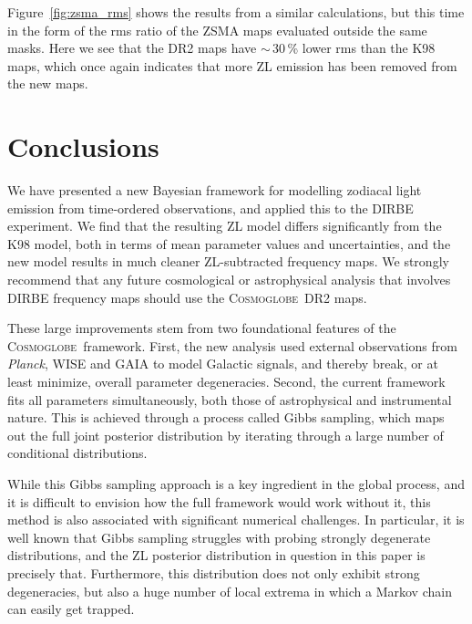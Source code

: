 \documentclass[twocolumn]{aa}
\def\Planck{\textit{Planck}}
\newcommand{\cosmoglobe}{\textsc{Cosmoglobe}}
\begin{document}
Figure~\ref{fig:zsma_rms} shows the results from a similar
calculations, but this time in the form of the rms ratio of the ZSMA
maps evaluated outside the same masks. Here we see that the DR2 maps
have $\sim$\,30\,\% lower rms than the K98 maps, which once
again indicates that more ZL emission has been removed from the
new maps.









\section{Conclusions}
\label{sec:conclusions}

We have presented a new Bayesian framework for modelling zodiacal
light emission from time-ordered observations, and applied this to the
DIRBE experiment. We find that the resulting ZL model differs
significantly from the K98 model, both in terms of mean parameter
values and uncertainties, and the new model results in much cleaner
ZL-subtracted frequency maps. We strongly recommend that any future
cosmological or astrophysical analysis that involves DIRBE frequency
maps should use the \cosmoglobe\ DR2 maps.

These large improvements stem from two foundational features of the
\cosmoglobe\ framework. First, the new analysis used external
observations from \Planck, WISE and GAIA to model Galactic signals,
and thereby break, or at least minimize, overall parameter
degeneracies. Second, the current framework fits all parameters
simultaneously, both those of astrophysical and instrumental
nature. This is achieved through a process called Gibbs sampling,
which maps out the full joint posterior distribution by iterating
through a large number of conditional distributions.

While this Gibbs sampling approach is a key ingredient in the global
process, and it is difficult to envision how the full framework would
work without it, this method is also associated with significant
numerical challenges. In particular, it is well known that Gibbs
sampling struggles with probing strongly degenerate distributions, and
the ZL posterior distribution in question in this paper is precisely
that. Furthermore, this distribution does not only exhibit strong
degeneracies, but also a huge number of local extrema in which a
Markov chain can easily get trapped.
\end{document}
